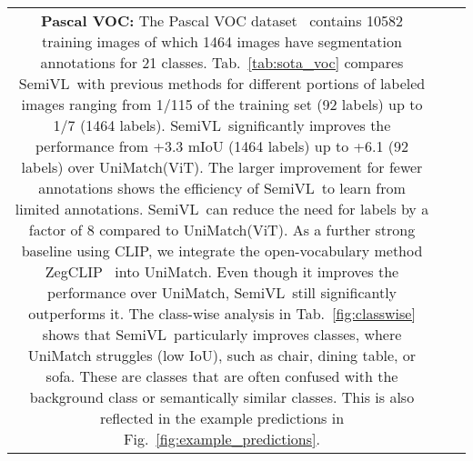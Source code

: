\documentclass[10pt,twocolumn,letterpaper]{article}
\newcommand{\ours}{SemiVL}
\begin{document}
\begin{figure*}
\begin{tabular}{ccc}
\noindent\textbf{Pascal VOC:} The Pascal VOC dataset~\cite{everingham2010pascal} contains 10582 training images of which 1464 images have segmentation annotations for 21 classes. 
Tab.~\ref{tab:sota_voc} compares \ours\ with previous methods for different portions of labeled images ranging from 1/115 of the training set (92 labels) up to 1/7 (1464 labels).
\ours\ significantly improves the performance from +3.3 mIoU (1464 labels) up to +6.1 (92 labels) over UniMatch(ViT). The larger improvement for fewer annotations shows the efficiency of \ours\ to learn from limited annotations. \ours\ can reduce the need for labels by a factor of 8 compared to UniMatch(ViT). 
As a further strong baseline using CLIP, we integrate the open-vocabulary method ZegCLIP~\cite{zhou2023zegclip} into UniMatch. Even though it improves the performance over UniMatch, \ours\ still significantly outperforms it. The class-wise analysis in Tab.~\ref{fig:classwise} shows that \ours\ particularly improves classes, where UniMatch struggles (low IoU), such as chair, dining table, or sofa.
These are classes that are often confused with the background class or semantically similar classes.
This is also reflected in the example predictions in Fig.~\ref{fig:example_predictions}.



\end{tabular}
\end{figure*}
\end{document}
